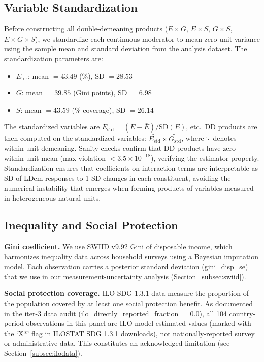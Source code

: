 \documentclass[11pt,letterpaper]{article}
\begin{document}
\subsection{Variable Standardization}
\label{subsec:standardization}

Before constructing all double-demeaning products ($E \times G$, $E \times S$, $G \times S$,
$E \times G \times S$), we standardize each continuous moderator to mean-zero unit-variance using
the sample mean and standard deviation from the analysis dataset. The standardization parameters
are:
\begin{itemize}
  \item $E_\text{ter}$: mean $= 43.49$ (\%), SD $= 28.53$
  \item $G$: mean $= 39.85$ (Gini points), SD $= 6.98$
  \item $S$: mean $= 43.59$ (\% coverage), SD $= 26.14$
\end{itemize}

The standardized variables are $E_\text{std} = (E - \bar{E}) / \text{SD}(E)$, etc.\ DD products
are then computed on the standardized variables: $\widetilde{E_\text{std}} \times
\widetilde{G_\text{std}}$, where $\widetilde{\cdot}$ denotes within-unit demeaning. Sanity checks
confirm that DD products have zero within-unit mean (max violation $< 3.5 \times 10^{-18}$),
verifying the estimator property. Standardization ensures that coefficients on interaction terms
are interpretable as SD-of-LDem responses to 1-SD changes in each constituent, avoiding the
numerical instability that emerges when forming products of variables measured in heterogeneous
natural units.

\subsection{Inequality and Social Protection}

\textbf{Gini coefficient.} We use SWIID v9.92 \citep{Solt2020} Gini of disposable income, which
harmonizes inequality data across household surveys using a Bayesian imputation model. Each
observation carries a posterior standard deviation (gini\_disp\_se) that we use in our
measurement-uncertainty analysis (Section~\ref{subsec:swiid}).

\textbf{Social protection coverage.} ILO SDG 1.3.1 data \citep{ILO2023} measure the proportion of
the population covered by at least one social protection benefit. As documented in the iter-3 data
audit (ilo\_directly\_reported\_fraction $= 0.0$), all 104 country-period observations in this
panel are ILO model-estimated values (marked with the `X*' flag in ILOSTAT SDG 1.3.1 downloads),
not nationally-reported survey or administrative data. This constitutes an acknowledged limitation
(see Section~\ref{subsec:ilodata}).
\end{document}
